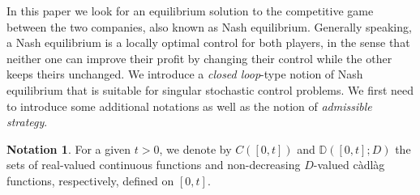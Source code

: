 \documentclass[10pt]{article}
\numberwithin{equation}{section}
\theoremstyle{plain}
\numberwithin{theorem}{section}
\theoremstyle{definition}
\newtheorem{notation}[theorem]{Notation}
\newcommand{\<}{\langle}
\renewcommand{\>}{\rangle}
\renewcommand{\(}{\left(}
\renewcommand{\)}{\right)}
\newcommand{\NCL}[1]{\mathbb{D} ([0,{#1}];D)}
\begin{document}
{In this paper we look for an equilibrium solution to the competitive game between the two companies, also known as Nash equilibrium. Generally speaking, a Nash equilibrium is {a locally} optimal control for both players, in the sense that neither one can improve their profit by changing their control while the other keeps theirs unchanged. {We introduce a \emph{closed loop}-type notion of Nash equilibrium that is suitable for singular stochastic control problems.
We first need to introduce some additional notations as well as the notion of \emph{admissible strategy}.}

\begin{notation}
For a given $t>0$, we denote by $C([0,t])$ and $\NCL{t}$ the sets of real-valued continuous functions and non-decreasing {$D$-valued} c\`adl\`ag functions, respectively, defined on $[0,t]$.
\end{notation}

}
\end{document}
